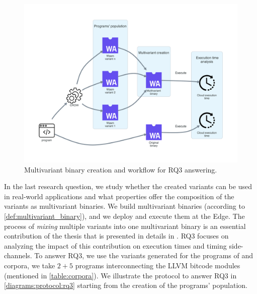 
\section{\rqthree}
\label{rq3:method}




\newcommand{\mewe}{MEWE\xspace}

\begin{figure}[h]
    \centering
    \includegraphics[width=0.8\linewidth]{diagrams/Rq3.pdf}
    \caption{Multivariant binary creation and workflow for RQ3 answering.}
    \label{diagrams:protocol:rq3}
\end{figure}

In the last research question, we study whether the created variants can be used in real-world applications and what properties offer the composition of the variants as multivariant binaries. We build multivariant binaries (according to \autoref{def:multivariant_binary}), and we deploy and execute them at the Edge. The process of \emph{mixing} multiple variants into one multivariant binary is an essential contribution of the thesis that is presented in details in \cite{2021arXiv210808125C}. RQ3 focuses on analyzing the impact of this contribution on execution times and timing side-channels. To answer RQ3, we use the variants generated for the programs of \corpussodium and \corpusqrcode corpora, we take $2 + 5$ programs interconnecting the LLVM bitcode modules (mentioned in \autoref{table:corpora}). We illustrate the protocol to answer RQ3 in \autoref{diagrams:protocol:rq3} starting from the creation of the programs' population.




